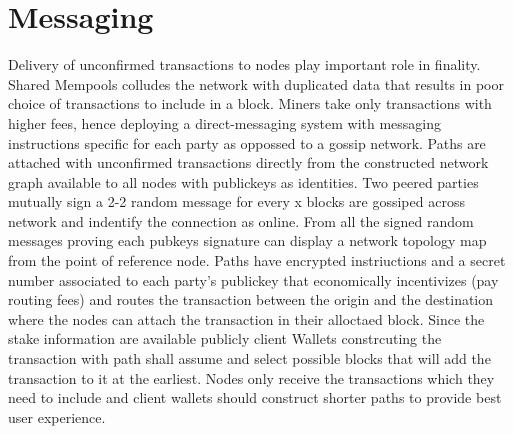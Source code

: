 \documentclass[a4paper,10pt]{article}
\begin{document}
\section{Messaging}
Delivery of unconfirmed transactions to nodes play important role in finality. Shared Mempools colludes the network with duplicated data that results in poor choice of transactions to include in a block. Miners take only transactions with higher fees, hence deploying a direct-messaging system with messaging instructions specific for each party as oppossed to a gossip network. Paths are attached with unconfirmed transactions directly from the constructed network graph available to all nodes with publickeys as identities. Two peered parties mutually sign a 2-2 random message for every x blocks are gossiped across network and indentify the connection as online. From all the signed random messages proving each pubkeys signature can display a network topology map from the point of reference node. Paths have encrypted instriuctions and a secret number associated to each party's publickey that economically incentivizes (pay routing fees) and routes the transaction between the origin and the destination where the nodes can attach the transaction in their alloctaed block. Since the stake information are available publicly client Wallets constrcuting the transaction with path shall assume and select possible blocks that will add the transaction to it at the earliest. Nodes only receive the transactions which they need to include and client wallets should construct shorter paths to provide best user experience.
\end{document}
